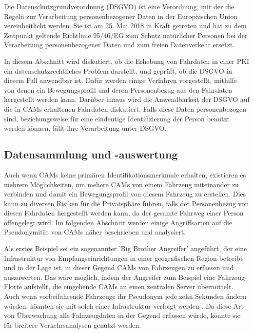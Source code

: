 Die Datenschutzgrundverordnung (DSGVO) ist eine Verordnung, mit der die Regeln zur Verarbeitung personenbezogener Daten in der Europäischen Union vereinheitlicht werden. Sie ist am 25. Mai 2018 in Kraft getreten und hat zu dem Zeitpunkt geltende Richtlinie 95/46/EG zum Schutz natürlicher Personen bei der Verarbeitung personenbezogener Daten und zum freien Datenverkehr ersetzt. 

In diesem Abschnitt wird diskutiert, ob die Erhebung von Fahrdaten in einer PKI ein datenschutzrechtliches Problem darstellt, und geprüft, ob die DSGVO in diesem Fall anwendbar ist. Dafür werden einige Verfahren vorgestellt, mithilfe von denen ein Bewegungsprofil und deren Personenbezug aus den Fahrdaten hergestellt werden kann. Darüber hinaus wird die Anwendbarkeit der DSGVO auf die in CAMs erhaltenen Fahrdaten diskutiert. Falls diese Daten personenbezogen sind, beziehungsweise für eine eindeutige Identifizierung der Person benutzt werden können, fällt ihre Verarbeitung unter DSGVO.

\subsection{Datensammlung und -auswertung}
\label{sec:FirstContentSection:ThirdSubSection}

Auch wenn CAMs keine primären Identifikationsmerkmale erhalten, existieren es mehrere Möglichkeiten, um mehere CAMs von einem Fahrzeug miteinander zu verbinden und damit ein Bewegungsprofil von diesem Fahrzeug zu erstellen. Dies kann zu diversen Risiken für die Privatsphäre führen, falls der Personenbezug von diesen Fahrdaten hergestellt werden kann, da der gesamte Fahrweg einer Person offengelegt wird. Im folgenden Abschnitt werden einige Angriffsarten auf die Pseudonymität von CAMs näher beschrieben und analysiert. 

Als erstes Beispiel sei ein sogenannter 'Big Brother Angreifer' angeführt, der eine Infrastruktur von Empfangseinrichtungen in einer geografischen Region betreibt und in der Lage ist, in dieser Gegend CAMs von Fahrzeugen zu erfassen und auszuwerten. Das wäre möglich, indem der Angreifer zum Beispiel eine Fahrzeug-Flotte aufstellt, die eingehende CAMs an einen zentralen Server übermittelt. Auch wenn vorbeifahrende Fahrzeuge ihr Pseudonym jede zehn Sekunden ändern würden, könnten sie mit solch einer Infrastruktur verfolgt werden \cite{Wiedersheim2010}. Da diese Art von Überwachung alle Fahrzeugdaten in der Gegend erfassen würde, könnte sie für breitere Verkehrsanalysen genutzt werden.

